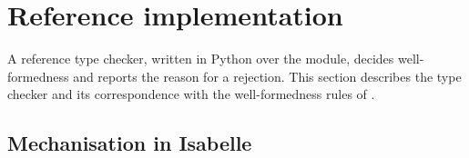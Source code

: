 \section{Reference implementation}
\label{sec:reference-implementation}

A reference type checker, written in Python over the  module, decides well-formedness and
reports the reason for a rejection. This section describes the type checker and its correspondence with the
well-formedness rules of .



\subsection{Mechanisation in Isabelle}
\label{sec:mechanisation}

